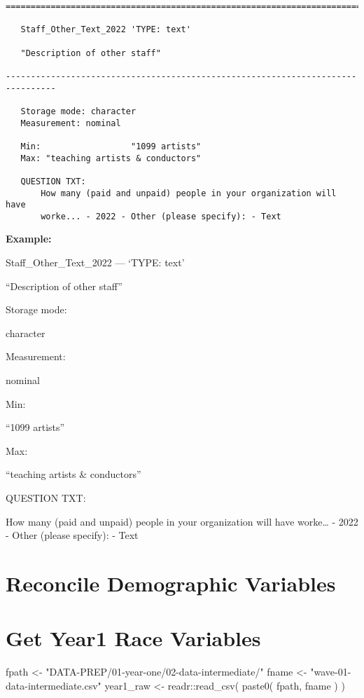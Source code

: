 \documentclass[
  letterpaper,
]{scrbook}
\newenvironment{Shaded}{\begin{snugshade}}{\end{snugshade}}
\newcommand{\FunctionTok}[1]{\textcolor[rgb]{0.28,0.35,0.67}{#1}}
\newcommand{\NormalTok}[1]{\textcolor[rgb]{0.00,0.23,0.31}{#1}}
\newcommand{\OtherTok}[1]{\textcolor[rgb]{0.00,0.23,0.31}{#1}}
\newcommand{\SpecialCharTok}[1]{\textcolor[rgb]{0.37,0.37,0.37}{#1}}
\newcommand{\StringTok}[1]{\textcolor[rgb]{0.13,0.47,0.30}{#1}}
\begin{document}
\begin{verbatim}
================================================================================

   Staff_Other_Text_2022 'TYPE: text'

   "Description of other staff"

--------------------------------------------------------------------------------

   Storage mode: character
   Measurement: nominal

   Min:                  "1099 artists"
   Max: "teaching artists & conductors"

   QUESTION TXT:
       How many (paid and unpaid) people in your organization will have
       worke... - 2022 - Other (please specify): - Text
\end{verbatim}

\textbf{Example:}

Staff\_Other\_Text\_2022 --- {`TYPE: text'}

``Description of other staff''

Storage mode:

character

Measurement:

nominal

Min:

``1099 artists''

Max:

``teaching artists \& conductors''

QUESTION TXT:

How many (paid and unpaid) people in your organization will have
worke\ldots{} - 2022 - Other (please specify): - Text

\chapter{Reconcile Demographic
Variables}\label{reconcile-demographic-variables-1}

\chapter{Get Year1 Race Variables}\label{get-year1-race-variables}

\begin{Shaded}
\begin{Highlighting}[]
\NormalTok{fpath     }\OtherTok{\textless{}{-}} \StringTok{"DATA{-}PREP/01{-}year{-}one/02{-}data{-}intermediate/"}
\NormalTok{fname     }\OtherTok{\textless{}{-}} \StringTok{"wave{-}01{-}data{-}intermediate.csv"}
\NormalTok{year1\_raw }\OtherTok{\textless{}{-}}\NormalTok{ readr}\SpecialCharTok{::}\FunctionTok{read\_csv}\NormalTok{( }\FunctionTok{paste0}\NormalTok{( fpath, fname ) )}
\end{Highlighting}
\end{Shaded}
\end{document}
